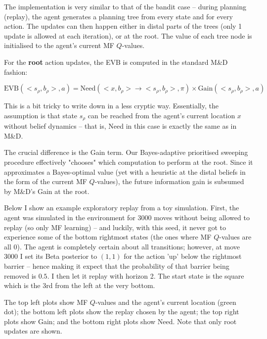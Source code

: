 \documentclass{article}
\begin{document}
\bigbreak

The implementation is very similar to that of the bandit case -- during planning (replay), the agent generates a planning tree 
from every state and for every action. The updates can then happen either in distal parts of the trees (only 1 update is allowed 
at each iteration), or at the root. The value of each tree node is initialised to the agent's current MF $Q$-values.

\bigbreak

For the \textbf{root} action updates, the EVB is computed in the standard M\&D fashion:

\begin{equation*}
    \text{EVB}(<s_{\rho}, b_{\rho}>, a) = \text{Need}(<x, b_{\rho}> \rightarrow <s_{\rho}, b_{\rho}>, \pi) \times \text{Gain}(<s_{\rho}, b_{\rho}>, a)
\end{equation*}

This is a bit tricky to write down in a less cryptic way. Essentially, the assumption is that state 
$s_{\rho}$ can be reached from the agent's current location $x$ without belief dynamics -- that is, 
Need in this case is exactly the same as in M\&D.

\bigbreak

The crucial difference is the Gain term. Our Bayes-adaptive prioritised sweeping procedure effectively 
"chooses" which computation to perform at the root. Since it approximates a Bayes-optimal value (yet with 
a heuristic at the distal beliefs in the form of the current MF $Q$-values), the future information gain 
is subsumed by M\&D's Gain at the root.

\bigbreak

Below I show an example exploratory replay from a toy simulation. First, the agent was simulated in the 
environment for 3000 moves without being allowed to replay (so only MF learning) -- and luckily, with 
this seed, it never got to experience some of the bottom rightmost states (the ones where MF $Q$-values are 
all 0). The agent is completely certain 
about all transitions; however, at move 3000 I set its Beta posterior to $(1, 1)$ for the action 'up' below 
the rightmost barrier -- hence making it expect that the probability of that barrier being removed is $0.5$.
I then let it replay with horizon 2. The start state is the square which is the 3rd from the left at the very bottom. 

\bigbreak

The top left plots show MF $Q$-values and the agent's current location (green dot); the bottom left plots show 
the replay chosen by the agent; the top right plots show Gain; and the bottom right plots show Need. Note that 
only root updates are shown.
\end{document}
